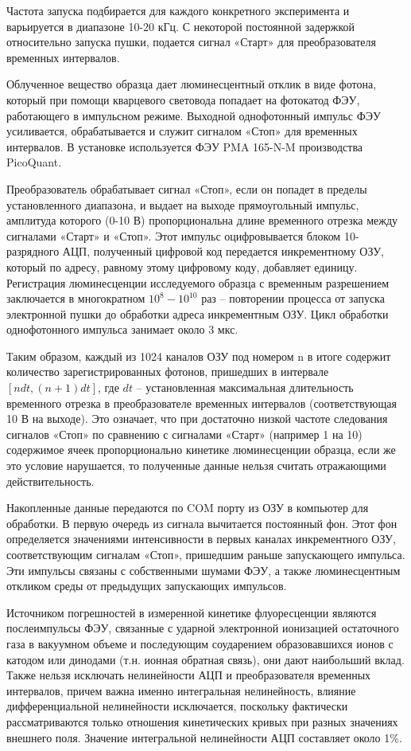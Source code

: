 \documentclass[14pt,titlepage]{extarticle}
\begin{document}
Частота запуска подбирается для каждого конкретного эксперимента и варьируется в диапазоне 10-20 кГц. С некоторой постоянной задержкой относительно запуска пушки, подается сигнал «Старт» для преобразователя временных интервалов.

Облученное вещество образца дает люминесцентный отклик в виде фотона, который при помощи кварцевого световода попадает на фотокатод ФЭУ, работающего в импульсном режиме. Выходной однофотонный импульс ФЭУ усиливается, обрабатывается и служит сигналом «Стоп» для временных интервалов. В установке используется ФЭУ PMA 165-N-M производства PicoQuant.

Преобразователь обрабатывает сигнал «Стоп», если он попадет в пределы установленного диапазона, и выдает на выходе прямоугольный импульс, амплитуда которого (0-10 В) пропорциональна длине временного отрезка между сигналами «Старт» и «Стоп». Этот импульс оцифровывается блоком 10-разрядного АЦП, полученный цифровой код передается инкрементному ОЗУ, который по адресу, равному этому цифровому коду, добавляет единицу. Регистрация люминесценции исследуемого образца с временным разрешением заключается в многократном \(10^8-10^{10}\) раз – повторении процесса от запуска электронной пушки до обработки адреса инкрементным ОЗУ. Цикл обработки однофотонного импульса занимает около 3 мкс.

Таким образом, каждый из 1024 каналов ОЗУ под номером n в итоге содержит количество зарегистрированных фотонов, пришедших в интервале \([n dt, (n+1)dt]\), где \(dt\) – установленная максимальная длительность временного отрезка в преобразователе временных интервалов (соответствующая 10 В на выходе). Это означает, что при достаточно низкой частоте следования сигналов «Стоп» по сравнению с сигналами «Старт» (например 1 на 10) содержимое ячеек пропорционально кинетике люминесценции образца, если же это условие нарушается, то полученные данные нельзя считать отражающими действительность.

Накопленные данные передаются по COM порту из ОЗУ в компьютер для обработки. В первую очередь из сигнала вычитается постоянный фон. Этот фон определяется значениями интенсивности в первых каналах инкрементного ОЗУ, соответствующим сигналам «Стоп», пришедшим раньше запускающего импульса. Эти импульсы связаны с собственными шумами ФЭУ, а также люминесцентным откликом среды от предыдущих запускающих импульсов.

Источником погрешностей в измеренной кинетике флуоресценции являются послеимпульсы ФЭУ, связанные с ударной электронной ионизацией остаточного газа в вакуумном объеме и последующим соударением образовавшихся ионов с катодом или динодами (т.н. ионная обратная связь), они дают наибольший вклад. Также нельзя исключать нелинейности АЦП и преобразователя временных интервалов, причем важна именно интегральная нелинейность, влияние дифференциальной нелинейности исключается, поскольку фактически рассматриваются только отношения кинетических кривых при разных значениях внешнего поля. Значение интегральной нелинейности АЦП составляет около 1\%.
\end{document}
